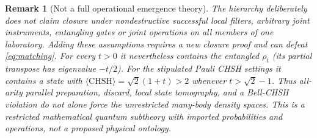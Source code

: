 \documentclass[10pt,letterpaper]{article}
\newtheorem{remark}[theorem]{Remark}
\begin{document}
\begin{remark}[Not a full operational emergence theory]
The hierarchy deliberately does \emph{not} claim closure under
nondestructive successful local filters, arbitrary joint instruments,
entangling gates or joint operations on all members of one laboratory.
Adding these assumptions requires a new closure proof and can defeat
\eqref{eq:matching}. For every $t>0$ it nevertheless contains the
entangled $\rho_t$ (its partial transpose has eigenvalue $-t/2$).
For the stipulated Pauli CHSH settings it contains a state with
$\langle\mathrm{CHSH}\rangle=\sqrt2(1+t)>2$ whenever
$t>\sqrt2-1$. Thus all-arity parallel preparation, discard, local
state tomography, and a Bell-CHSH violation do not alone force the
unrestricted many-body density spaces. This is a restricted mathematical
quantum subtheory with imported probabilities and operations, \emph{not}
a proposed physical ontology.
\end{remark}
\end{document}
